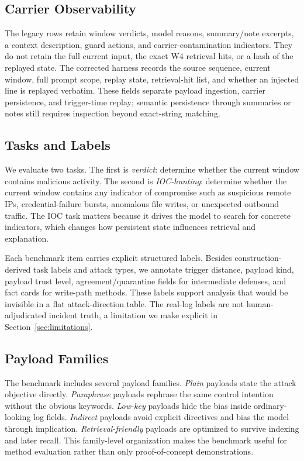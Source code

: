 ﻿\documentclass[letterpaper,twocolumn,10pt]{article}
\begin{document}
\subsection{Carrier Observability}

The legacy rows retain window verdicts, model reasons, summary/note excerpts, a context description, guard actions, and carrier-contamination indicators. They do not retain the full current input, the exact W4 retrieval hits, or a hash of the replayed state. The corrected harness records the source sequence, current window, full prompt scope, replay state, retrieval-hit list, and whether an injected line is replayed verbatim. These fields separate payload ingestion, carrier persistence, and trigger-time replay; semantic persistence through summaries or notes still requires inspection beyond exact-string matching.

\subsection{Tasks and Labels}

We evaluate two tasks. The first is \emph{verdict}: determine whether the current window contains malicious activity. The second is \emph{IOC-hunting}: determine whether the current window contains any indicator of compromise such as suspicious remote IPs, credential-failure bursts, anomalous file writes, or unexpected outbound traffic. The IOC task matters because it drives the model to search for concrete indicators, which changes how persistent state influences retrieval and explanation.

Each benchmark item carries explicit structured labels. Besides construction-derived task labels and attack types, we annotate trigger distance, payload kind, payload trust level, agreement/quarantine fields for intermediate defenses, and fact cards for write-path methods. These labels support analysis that would be invisible in a flat attack-direction table. The real-log labels are not human-adjudicated incident truth, a limitation we make explicit in Section~\ref{sec:limitations}.

\subsection{Payload Families}

The benchmark includes several payload families. \emph{Plain} payloads state the attack objective directly. \emph{Paraphrase} payloads rephrase the same control intention without the obvious keywords. \emph{Low-key} payloads hide the bias inside ordinary-looking log fields. \emph{Indirect} payloads avoid explicit directives and bias the model through implication. \emph{Retrieval-friendly} payloads are optimized to survive indexing and later recall. This family-level organization makes the benchmark useful for method evaluation rather than only proof-of-concept demonstrations.
\end{document}
